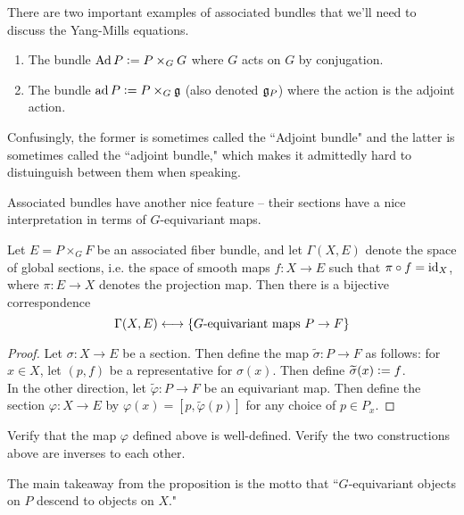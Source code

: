 %
\begin{exmp}
There are two important examples of associated bundles that we'll need to discuss
the Yang-Mills equations.
\begin{enumerate}
  \item The bundle $\operatorname{Ad} P \vcentcolon= P \times_G G$ where $G$ acts on $G$ by conjugation.
  \item The bundle $\operatorname{ad} P \vcentcolon= P \times_G \mathfrak{g}$ (also denoted $\mathfrak{g}_P$) where
  the action is the adjoint action.
\end{enumerate}
Confusingly, the former is sometimes called the ``Adjoint bundle" and the
latter is sometimes called the ``adjoint bundle," which makes it admittedly
hard to distuinguish between them when speaking.
\end{exmp}
%
Associated bundles have another nice feature -- their sections have
a nice interpretation in terms of $G$-equivariant maps.
%
\begin{prop}
Let $E = P \times_G F$ be an associated fiber bundle, and let
$\Gamma(X,E)$ denote the space of global sections, i.e. the space of
smooth maps $f : X \to E$ such that $\pi \circ f = \operatorname{id}_X$, where
$\pi : E \to X$ denotes the projection map. Then there is a bijective correspondence
\[
\Gamma(X,E) \longleftrightarrow \left\lbrace G\text{-equivariant maps } P \to F \right\rbrace
\]
\end{prop}
%
\begin{proof}
Let $\sigma : X \to E$ be a section. Then define the map
$\widetilde{\sigma} : P \to F$ as follows: for $x \in X$, let $(p,f)$ be a
representative for $\sigma(x)$. Then define $\widetilde{\sigma}(x) \vcentcolon= f$. \\

In the other direction, let $\widetilde{\varphi} : P \to F$ be an equivariant
map. Then define the section $\varphi : X \to E$ by
$\varphi(x) = [p,\widetilde{\varphi}(p)]$ for any choice of $p \in P_x$.
\end{proof}
%
\begin{exer}
Verify that the map $\varphi$ defined above is well-defined. Verify the two
constructions above are inverses to each other.
\end{exer}
%
The main takeaway from the proposition is the motto that ``$G$-equivariant
objects on $P$ descend to objects on $X$." \\

